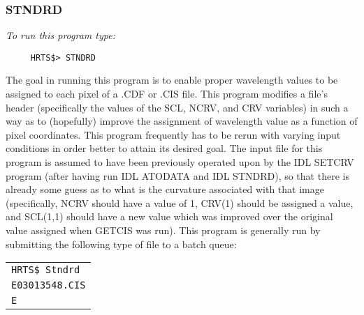 \subsubsection{STNDRD}

{\em To run this program type:}
\begin{verbatim}
     HRTS$> STNDRD
\end{verbatim}
      The goal in running this program is to enable proper wavelength
   values to be assigned to each pixel of a .CDF or .CIS file.  This
   program modifies a file's header (specifically the values of the SCL,
   NCRV, and CRV variables) in such a way as to (hopefully) improve the
   assignment of wavelength value as a function of pixel coordinates.
   This program frequently has to be rerun with varying input conditions
   in order better to attain its desired goal.
      The input file for this program is assumed to have been previously
   operated upon by the IDL SETCRV program (after having run IDL ATODATA
   and IDL STNDRD), so that there is already some guess as to what is the
   curvature associated with that image (specifically, NCRV should have a
   value of 1, CRV(1) should be assigned a value, and SCL(1,1) should have
   a new value which was improved over the original value assigned when
   GETCIS was run).
      This program is generally run by submitting the following type of
    file to a batch queue:
\begin{center}
\begin{tabular}{||l||}
\hline

                   {\tt HRTS\$ Stndrd} \\
                   {\tt E03013548.CIS}\\
                   {\tt E} \\
\hline
\end{tabular}
\end{center}

